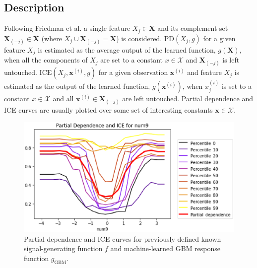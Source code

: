 \documentclass[11pt]{asaproc}
\begin{document}
\subsection{Description}
	
Following Friedman et al. a single feature $X_j \in \mathbf{X}$ and its complement set $\mathbf{X}_{(-j)} \in \mathbf{X}$ (where $X_j \cup \mathbf{X}_{(-j)} = \mathbf{X}$) is considered. $\text{PD}(X_j, g)$ for a given feature $X_j$ is estimated as the average output of the learned function, $g(\mathbf{X})$, when all the components of $X_j$ are set to a constant $x \in \mathcal{X}$ and $\mathbf{X}_{(-j)}$ is left untouched. $\text{ICE}(X_j, \mathbf{x}^{(i)}, g)$ for a given observation $\mathbf{x}^{(i)}$ and feature $X_j$ is estimated as the output of the learned function, $g(\mathbf{x}^{(i)})$, when $x^{(i)}_j$ is set to a constant $x \in \mathcal{X}$ and all $\mathbf{x}^{(i)} \in \mathbf{X}_{(-j)}$ are left untouched. Partial dependence and ICE curves are usually plotted over some set of interesting constants $\mathbf{x} \in \mathcal{X}$. 

\begin{figure}[htb]
	\begin{center}
		\includegraphics[scale=0.5]{img/figure_4.eps}
		\caption{Partial dependence and ICE curves for previously defined known signal-generating function $f$ and machine-learned GBM response function $g_{\text{GBM}}$.}
		\label{fig:pdp_ice}
	\end{center}
\end{figure}
\end{document}
